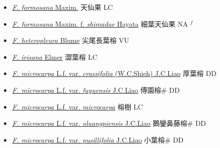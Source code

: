 \begin{itemize}
\begin{itemize}
        \item[] \href{http://www.theplantlist.org/tpl1.1/search?q=Ficus+formosana}{\textit{F. formosana} Maxim.}   天仙果 LC
        \item[] \href{http://www.theplantlist.org/tpl1.1/search?q=Ficus+formosana+ f. +shimadae}{\textit{F. formosana} Maxim.  f.  \textit{shimadae} Hayata}   細葉天仙果 NA $^f$
        \item[] \href{http://www.theplantlist.org/tpl1.1/search?q=Ficus+heteropleura}{\textit{F. heteropleura} Blume}   尖尾長葉榕 VU
        \item[] \href{http://www.theplantlist.org/tpl1.1/search?q=Ficus+irisana}{\textit{F. irisana} Elmer}   澀葉榕 LC
        \item[] \href{http://www.theplantlist.org/tpl1.1/search?q=Ficus+microcarpa+var.+crassifolia}{\textit{F. microcarpa} L.f. var. \textit{crassifolia} (W.C.Shieh) J.C.Liao}   厚葉榕 DD
        \item[] \href{http://www.theplantlist.org/tpl1.1/search?q=Ficus+microcarpa+var.+fuyuensis}{\textit{F. microcarpa} L.f. var. \textit{fuyuensis} J.C.Liao}   傅園榕\# DD
        \item[] \href{http://www.theplantlist.org/tpl1.1/search?q=Ficus+microcarpa+var.+microcarpa}{\textit{F. microcarpa} L.f. var. \textit{microcarpa}}   榕樹 LC
        \item[] \href{http://www.theplantlist.org/tpl1.1/search?q=Ficus+microcarpa+var.+oluangpiensis}{\textit{F. microcarpa} L.f. var. \textit{oluangpiensis} J.C.Liao}   鵝鑾鼻藤榕\# DD
        \item[] \href{http://www.theplantlist.org/tpl1.1/search?q=Ficus+microcarpa+var.+pusillifolia}{\textit{F. microcarpa} L.f. var. \textit{pusillifolia} J.C.Liao}   小葉榕\# DD

\end{itemize}
\end{itemize}
